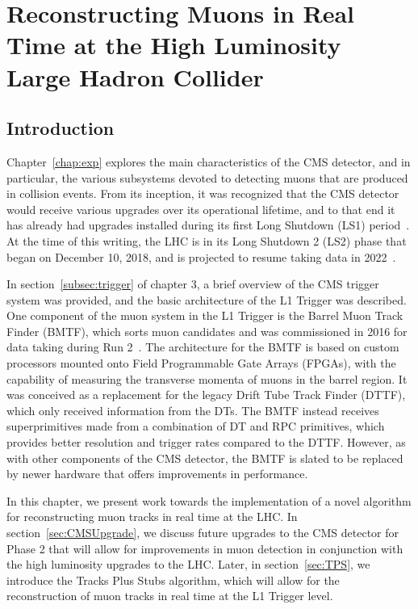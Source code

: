 
\chapter{Reconstructing Muons in Real Time at the High Luminosity Large Hadron Collider}
\label{chap:TPS}

\section{Introduction}

Chapter~\ref{chap:exp} explores the main characteristics of the CMS detector, and in particular, the various subsystems devoted to detecting muons that are produced in collision events.
From its inception, it was recognized that the CMS detector would receive various upgrades over its operational lifetime, and to that end it has already had upgrades installed during its first Long Shutdown (LS1) period~\cite{Battilana:2017mrm,Kreis:2103853}.
At the time of this writing, the LHC is in its Long Shutdown 2 (LS2) phase that began on December 10, 2018, and is projected to resume taking data in 2022~\cite{LHCsched}.

In section~\ref{subsec:trigger} of chapter 3, a brief overview of the CMS trigger system was provided, and the basic architecture of the L1 Trigger was described.
One component of the muon system in the L1 Trigger is the Barrel Muon Track Finder (BMTF), which sorts muon candidates and was commissioned in 2016 for data taking during Run 2~\cite{Ero:2102885}.
The architecture for the BMTF is based on custom processors mounted onto Field Programmable Gate Arrays (FPGAs), with the capability of measuring the transverse momenta of muons in the barrel region.
It was conceived as a replacement for the legacy Drift Tube Track Finder (DTTF), which only received information from the DTs.
The BMTF instead receives superprimitives made from a combination of DT and RPC primitives, which provides better resolution and trigger rates compared to the DTTF.
However, as with other components of the CMS detector, the BMTF is slated to be replaced by newer hardware that offers improvements in performance.

In this chapter, we present work towards the implementation of a novel algorithm for reconstructing muon tracks in real time at the LHC.
In section~\ref{sec:CMSUpgrade}, we discuss future upgrades to the CMS detector for Phase 2 that will allow for improvements in muon detection in conjunction with the high luminosity upgrades to the LHC.
Later, in section~\ref{sec:TPS}, we introduce the Tracks Plus Stubs algorithm, which will allow for the reconstruction of muon tracks in real time at the L1 Trigger level.

